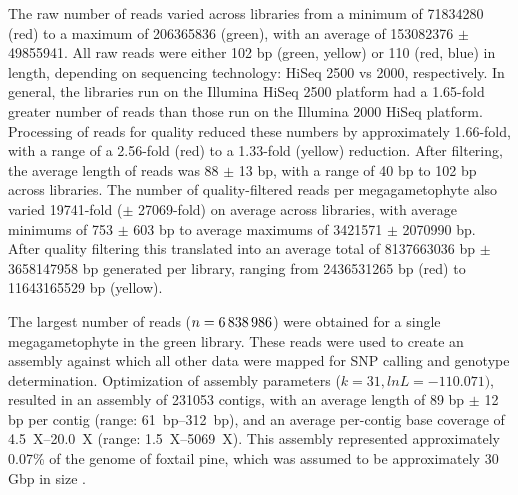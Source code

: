 \documentclass[smallextended]{svjour3}
\begin{document}
The raw number of reads varied across libraries from a minimum of \num{71834280}
(red) to a maximum of \num{206365836} (green), with an average of
\num{153082376} $\pm$ \num{49855941}. All raw reads were either 102 bp (green,
yellow) or 110 (red, blue) in length, depending on sequencing technology: HiSeq
2500 vs 2000, respectively. In general, the libraries run on the Illumina HiSeq
2500 platform had a \num{1.65}-fold greater number of reads than those run on
the Illumina 2000 HiSeq platform. Processing of reads for quality reduced these
numbers by approximately \num{1.66}-fold, with a range of a \num{2.56}-fold
(red) to a \num{1.33}-fold (yellow) reduction. After filtering, the average
length of reads was 88 $\pm$ 13 bp, with a range of 40 bp to 102 bp across
libraries.  The number of quality-filtered reads per megagametophyte also varied
\num{19741}-fold ($\pm$ \num{27069}-fold) on average across libraries, with
average minimums of 753 $\pm$ 603 bp to average maximums of \num{3421571} $\pm$
\num{2070990} bp. After quality filtering this translated into an average total
of \num{8137663036} bp $\pm$ \num{3658147958} bp generated per library, ranging
from \num{2436531265} bp (red) to \num{11643165529} bp (yellow).

The largest number of reads ($n=\text{\num{6838986}}$) were obtained for a
single megagametophyte in the green library. These reads were used to create an
assembly against which all other data were mapped for SNP calling and genotype
determination. Optimization of assembly parameters ($k=31, lnL=-110.071)$,
resulted in an assembly of \num{231053} contigs, with an average length of 89 bp
$\pm$ 12 bp per contig (range: \SIrange {61}{312}{bp}), and an average
per-contig base coverage of \SIrange{4.5}{20.0}{X} (range:
\SIrange{1.5}{5069}{X}). This assembly represented approximately 0.07\% of the
genome of foxtail pine, which was assumed to be approximately 30 Gbp in size
\citep{Murray:1998}.
\end{document}
